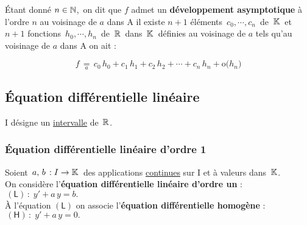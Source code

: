 \vspace{1.3cm}

Étant donné \(n\in\mathbb{N}\),\, on dit que $f$ admet un \textbf{développement asymptotique} à l'ordre $n$ au voisinage de $a$ dans A \ssi il existe $n+1$ éléments \(\, c_0,\cdots,c_n\,\) de \(\,\mathbb{K}\,\) et $n+1$ fonctions \(\,h_0,\cdots,h_n\,\) de \(\,\mathbb{R}\,\) dans \(\,\mathbb{K}\,\) définies au voisinage de $a$ tels qu'au voisinage de $a$ dans A on ait :\vspace{-0.3cm}

\[f\,\underset{a}{=}\,c_0\,h_0+c_1\,h_1+c_2\,h_2+\cdots+c_n\,h_n+\mathrm{o}\bigl(h_n\bigr)\]

\vspace{1.5cm}

\subsection{Équation différentielle linéaire}

\vspace{0.7cm}

\begin{center}
    I désigne un \underline{intervalle} de \(\,\mathbb{R}\).
\end{center}

\vspace{0.3cm}

\subsubsection[EDL d'ordre 1]{Équation différentielle linéaire d'ordre 1}

\vspace{0.7cm}

Soient $\,a,\,b\,:I\to \mathbb{K}\,$ des applications \underline{continues} sur I et à valeurs dans $\,\mathbb{K}$.\vspace{0.2cm}\\
On considère l'\textbf{équation différentielle linéaire d'ordre un} : \(\, \left(\mathsf{L}\right)\,:\; y'+a\,y=b.\)\vspace{0.2cm}\\
À l'équation $\left(\mathsf{L}\right)$ on associe l'\textbf{équation différentielle homogène} : \(\, \left(\mathsf{H}\right)\,:\; y'+a\,y=0.\)

\vspace{1.2cm}

